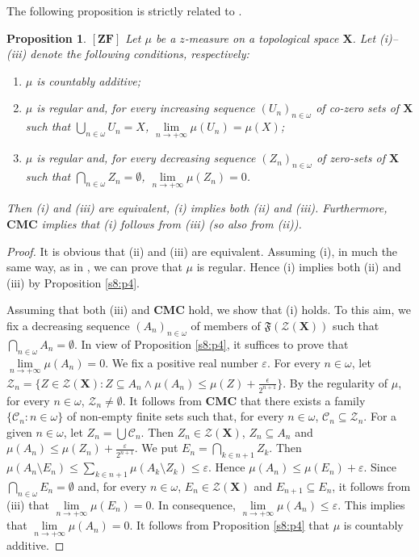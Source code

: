 \documentclass[12pt,twoside,leqno]{article}
\theoremstyle{plain}
\newtheorem{proposition}[theorem]{Proposition}
\theoremstyle{definition}
\theoremstyle{remark}
\begin{document}
The following proposition is strictly related to \cite[Proposition A, Chapter VIII.4, p. 484]{nag}.
\begin{proposition}
	\label{s8:p5}
	$[\mathbf{ZF}]$ Let $\mu$ be a $z$-measure on a topological space $\mathbf{X}$. Let (i)--(iii) denote the following conditions, respectively:
	\begin{enumerate}
		\item[(i)] $\mu$ is countably additive;
		\item[(ii)] $\mu$ is regular and, for every increasing sequence $(U_n)_{n\in\omega}$ of co-zero sets of $\mathbf{X}$ such that $\bigcup_{n\in\omega}U_n=X$, $\lim\limits_{n\to+\infty}\mu(U_n)=\mu(X)$;
		\item[(iii)]  $\mu$ is regular and, for every decreasing sequence $(Z_n)_{n\in\omega}$ of zero-sets of $\mathbf{X}$ such that $\bigcap_{n\in\omega}Z_n=\emptyset$, $\lim\limits_{n\to+\infty}\mu(Z_n)=0$.
	\end{enumerate}
	Then (i) and (iii) are equivalent, (i) implies both (ii) and (iii). Furthermore, $\mathbf{CMC}$ implies that (i) follows from (iii) (so also from (ii)).
\end{proposition}
\begin{proof}
	It is obvious that (ii) and (iii) are equivalent. Assuming (i), in much the same way, as in \cite[p. 484]{nag}, we can prove that $\mu$ is regular. Hence (i) implies both (ii) and (iii) by Proposition \ref{s8:p4}. 
	
	Assuming that both (iii) and  $\mathbf{CMC}$ hold, we show that (i) holds. To this aim, we fix a decreasing sequence $(A_n)_{n\in\omega}$  of members of $\mathfrak{F}(\mathcal{Z}(\mathbf{X}))$ such that $\bigcap_{n\in\omega}A_n=\emptyset$. In view of Proposition \ref{s8:p4}, it suffices to prove that $\lim\limits_{n\to+\infty}\mu(A_n)=0$. We fix a positive real number $\varepsilon$.  For every $n\in\omega$, let $\mathcal{Z}_n=\{Z\in\mathcal{Z}(\mathbf{X}): Z\subseteq A_n\wedge \mu(A_n)\leq\mu(Z)+\frac{\epsilon}{2^{n+1}}\}$. By the regularity of $\mu$, for every $n\in\omega$, $\mathcal{Z}_n\neq\emptyset$. It follows from $\mathbf{CMC}$ that there exists a family $\{\mathcal{C}_n: n\in\omega\}$ of non-empty finite sets such that, for every $n\in\omega$, $\mathcal{C}_n\subseteq\mathcal{Z}_n$. For a given $n\in\omega$, let $Z_n=\bigcup\mathcal{C}_n$. Then $Z_n\in\mathcal{Z}(\mathbf{X})$, $Z_n\subseteq A_n$ and $\mu(A_n)\leq\mu(Z_n)+\frac{\varepsilon}{2^{n+1}}$. We put $E_n=\bigcap_{k\in n+1}Z_k$. Then $\mu(A_n\setminus E_n)\leq\sum_{k\in n+1}\mu(A_k\setminus Z_k)\leq\varepsilon$. Hence $\mu(A_n)\leq\mu (E_n)+\varepsilon$. Since $\bigcap_{n\in\omega}E_n=\emptyset$ and, for every $n\in\omega$, $E_n\in\mathcal{Z}(\mathbf{X})$ and $E_{n+1}\subseteq E_n$, it follows from (iii) that $\lim\limits_{n\to+\infty}\mu(E_n)=0$. In consequence, $\lim\limits_{n\to+\infty}\mu(A_n)\leq\varepsilon$. This implies that $\lim\limits_{n\to+\infty}\mu(A_n)=0$. It follows from Proposition \ref{s8:p4} that $\mu$ is countably additive.
\end{proof}
\end{document}
